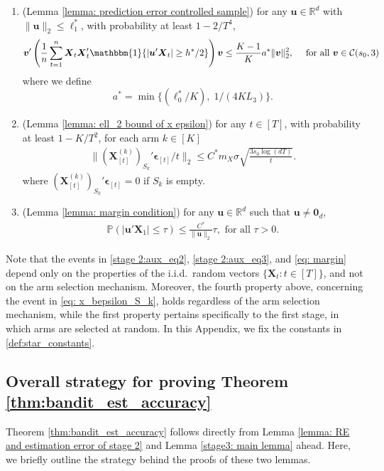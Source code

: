 \documentclass[aos,preprint]{imsart}
\theoremstyle{plain}
\theoremstyle{definition}
\newcommand{\bd}[1]{\boldsymbol{#1}}
\newcommand{\idf}{\mathbbm{1}}
\newcommand{\bX}{\boldsymbol{X}}
\newcommand{\bu}{\boldsymbol{u}}
\newcommand{\bv}{\boldsymbol{v}}
\newcommand{\bepsilon}{\bd{\epsilon}}
\newcommand{\bR}{\mathbb{R}}
\newcommand{\Pro}{\mathbb{P}}
\begin{document}
\begin{appendix}
\begin{enumerate}
    \item (Lemma \ref{lemma: prediction error controlled sample}) 
    for any $\bu \in \bR^d$ with $\|\bu\|_2 \leq \ell_1^*$,   
    with probability at least $1-2/T^4$, 
        \begin{equation}\label{stage 2:aux_eq3}
\bv'\left(\frac{1}{n}\sum_{t=1}^{n} \bX_t\bX_t'\idf\{|\bu'\bX_t|\ge h^*/2\} \right) \bv \le \frac{K-1}{K} a^* \|\bv\|_2^2,\quad \text{ for all } 
\bv\in \mathcal{C}(s_0,3)   
\end{equation}
where we define
\begin{equation}\label{eq: a}
    a^*= \min\{(\ell_0^*/K),\; 1/(4K L_3)\}.  %
\end{equation} 
\item (Lemma \ref{lemma: ell_2 bound of x epsilon}) for any $t \in [T]$, with probability  at least $1-K/T^2$, for each arm $k \in [K]$
\begin{align}\label{eq: x_bepsilon_S_k}
 \|(\bX_{[t]}^{(k)})_{S_k}'\bepsilon_{[t]}/t\|_2 \le C^*  m_X\sigma\sqrt{\frac{3s_0\log (dT)}{t}}.
\end{align}
where $(\bX_{[t]}^{(k)})_{S_k}'\bepsilon_{[t]} = 0$ if $S_k$ is empty.
\item   (Lemma \ref{lemma: margin condition}) for any $\bu \in \bR^{d}$ such that $\bu \neq \bd{0}_d$,
\begin{align}
    \label{eq: margin}
    \Pro(|\bu'\bX_1|\le \tau)\le 
    \frac{C^*}{\|\bu\|_2 } \tau, \text{ for all } \tau>0.
\end{align}

\end{enumerate}


Note that the events in \eqref{stage 2:aux_eq2}, \eqref{stage 2:aux_eq3}, and \eqref{eq: margin} depend only on the properties of the i.i.d.\ random vectors $\{\bX_t: t \in [T]\}$, and not on the arm selection mechanism. Moreover, the fourth property above, concerning the event in \eqref{eq: x_bepsilon_S_k}, holds regardless of the arm selection mechanism, while the first property pertains specifically to the first stage, in which arms are selected at random. In this Appendix, we fix the constants in \eqref{def:star_constants}.


\subsection{Overall strategy for proving Theorem \ref{thm:bandit_est_accuracy}} \label{subsec:discussion_bandit_est}
Theorem \ref{thm:bandit_est_accuracy} follows directly from Lemma \ref{lemma: RE and estimation error of stage 2} and Lemma \ref{stage3: main lemma} ahead. Here, we briefly outline the strategy behind the proofs of these two lemmas.


\end{appendix}
\end{document}
